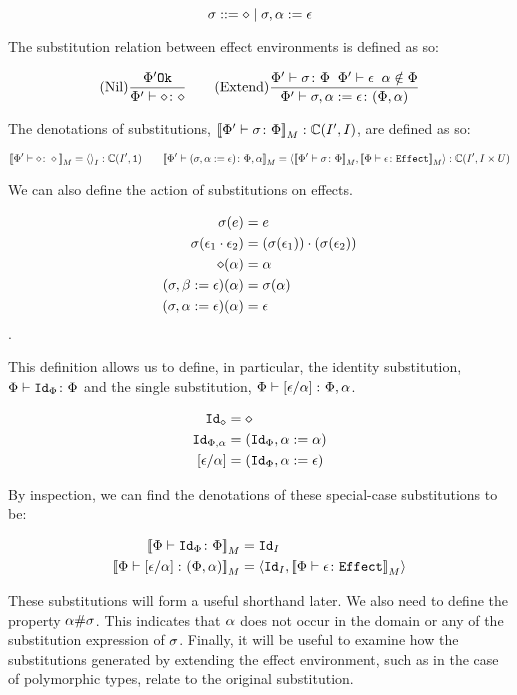 \documentclass{Report}
\begin{document}
\[
    \sigma ::= \diamond \mid \sigma, \alpha := \epsilon    
\]

The substitution relation between effect environments is defined as so:

\[
    (\text{Nil}) \frac{\Phi' \texttt{Ok}}{\Phi' \vdash \diamond \colon \diamond}
    \quad\quad
    (\text{Extend}) \frac{\Phi' \vdash \sigma \colon \Phi\;\;\Phi'\vdash \epsilon\;\;\alpha\notin\Phi}{\Phi' \vdash \sigma, \alpha :=\epsilon \colon (\Phi, \alpha)}
\]

The denotations of substitutions, ${\bf [\![}\Phi' \vdash \sigma \colon \Phi{\bf ]\!]}_M: \mathbb{C}(I', I)$, are defined as so:

\[
    \deno{\typerelation{\P'}{\nil}{\nil}} = \term{I}: \C(I', \1)
    \quad\quad
    \deno{\typerelation{\P'}{(\si, \a\setto\e)}{\P,\a}} = \pr{\deno{\typerelation{\P'}{\si}{\P}}}{\deno{\typerelation{\P}{\e}{\effect}}}: \C(I', I\times U)
\]

We can also define the action of substitutions on effects.

\begin{align}
    \sigma(e) & = e \\
    \sigma(\epsilon_1\cdot\epsilon_2) & = (\sigma(\epsilon_1))\cdot(\sigma(\epsilon_2))\\
    \diamond(\alpha) & = \alpha\\
    (\sigma, \beta:= \epsilon)(\alpha) & = \sigma(\alpha) \\
    (\sigma, \alpha:= \epsilon)(\alpha) & =\epsilon
\end{align}.

This definition allows us to define, in particular, the identity substitution,$\Phi \vdash \texttt{Id}_{\Phi} \colon \Phi$ and the single substitution, $\Phi \vdash \left[\epsilon / \alpha\right] \colon \Phi,\alpha$.


\begin{align}
    \texttt{Id}_{\diamond} & = \diamond\\
    \texttt{Id}_{\Phi,\alpha} & = (\texttt{Id}_{\Phi}, \alpha:=\alpha)\\
    \left[\epsilon / \alpha\right] & = (\texttt{Id}_{\Phi}, \alpha:= \epsilon)
\end{align}

By inspection, we can find the denotations of these special-case substitutions to be:

\begin{align}
    {\bf [\![}\Phi \vdash \texttt{Id}_{\Phi} \colon \Phi{\bf ]\!]}_M & = \texttt{Id}_{I}\\
    {\bf [\![}\Phi \vdash \left[\epsilon / \alpha\right] \colon (\Phi,\alpha){\bf ]\!]}_M & = \left\langle\texttt{Id}_{I}, {\bf [\![}\Phi \vdash \epsilon \colon \texttt{Effect}{\bf ]\!]}_M\right\rangle
\end{align}


These substitutions will form a useful shorthand later. We also need to define the property $\alpha \# \sigma$. This indicates that $\alpha$ does not occur in the domain or any of the substitution expression of $\sigma$. Finally, it will be useful to examine how the substitutions generated by extending the effect environment, such as in the case of polymorphic types, relate to the original substitution.
\end{document}
